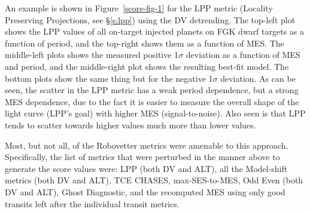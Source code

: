 An example is shown in Figure~\ref{score-fig-1} for the LPP metric (Locality Preserving Projections, see \S\ref{s:lpp}) using the DV detrending. The top-left plot shows the LPP values of all on-target injected planets on FGK dwarf targets as a function of period, and the top-right shows them as a function of MES. The middle-left plots shows the measured positive 1$\sigma$ deviation as a function of MES and period, and the middle-right plot shows the resulting best-fit model. The bottom plots show the same thing but for the negative 1$\sigma$ deviation. As can be seen, the scatter in the LPP metric has a weak period dependence, but a strong MES dependence, due to the fact it is easier to measure the overall shape of the light curve (LPP's goal) with higher MES (signal-to-noise). Also seen is that LPP tends to scatter towards higher values much more than lower values.

Most, but not all, of the Robovetter metrics were amenable to this approach. Specifically, the list of metrics that were perturbed in the manner above to generate the score values were: LPP (both DV and ALT), all the Model-shift metrics (both DV and ALT), TCE CHASES, max-SES-to-MES, Odd Even (both DV and ALT), Ghost Diagnostic, and the recomputed MES using only good transits left after the individual transit metrics.

